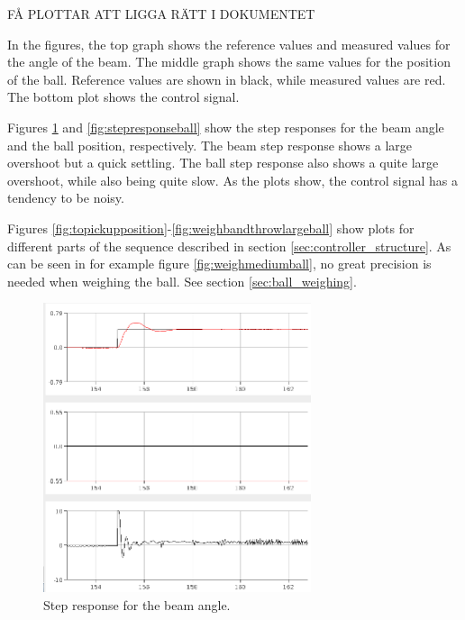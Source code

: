 
FÅ PLOTTAR ATT LIGGA RÄTT I DOKUMENTET

In the figures, the top graph shows the reference values and measured values for the angle of the beam. 
The middle graph shows the same values for the position of the ball. 
Reference values are shown in black, while measured values are red. 
The bottom plot shows the control signal.

Figures \ref{fig:stepresponsebeam} and \ref{fig:stepresponseball} show the step responses for the beam angle and the ball position, respectively. 
The beam step response shows a large overshoot but a quick settling.
The ball step response also shows a quite large overshoot, while also being quite slow.
As the plots show, the control signal has a tendency to be noisy.

Figures \ref{fig:topickupposition}-\ref{fig:weighbandthrowlargeball} show plots for different parts of the sequence described in section \ref{sec:controller_structure}.
As can be seen in for example figure \ref{fig:weighmediumball}, no great precision is needed when weighing the ball. See section \ref{sec:ball_weighing}.

\begin{figure}[h]
\centering
\includegraphics[width=0.7\textwidth]{figures/stepresponsebeam-crop.png}
\caption{Step response for the beam angle.}
\label{fig:stepresponsebeam}
\end{figure}

